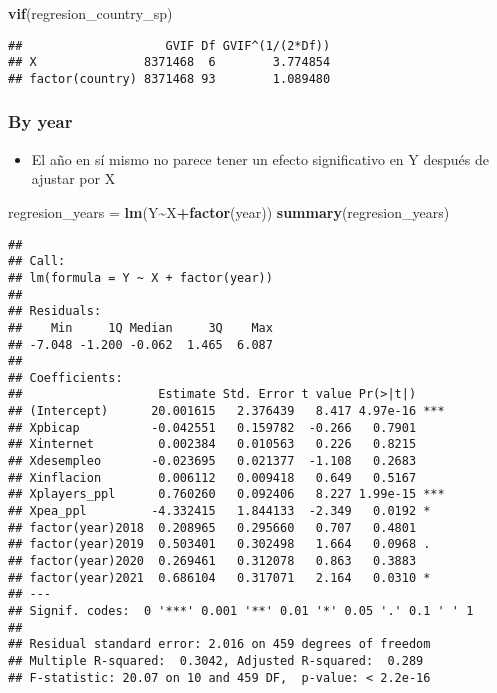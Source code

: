 \documentclass[
]{article}
\newenvironment{Shaded}{\begin{snugshade}}{\end{snugshade}}
\newcommand{\FunctionTok}[1]{\textcolor[rgb]{0.13,0.29,0.53}{\textbf{#1}}}
\newcommand{\NormalTok}[1]{#1}
\newcommand{\OtherTok}[1]{\textcolor[rgb]{0.56,0.35,0.01}{#1}}
\newcommand{\SpecialCharTok}[1]{\textcolor[rgb]{0.81,0.36,0.00}{\textbf{#1}}}
\providecommand{\tightlist}{%
  \setlength{\itemsep}{0pt}\setlength{\parskip}{0pt}}
\begin{document}
\begin{Shaded}
\begin{Highlighting}[]
\FunctionTok{vif}\NormalTok{(regresion\_country\_sp)}
\end{Highlighting}
\end{Shaded}

\begin{verbatim}
##                    GVIF Df GVIF^(1/(2*Df))
## X               8371468  6        3.774854
## factor(country) 8371468 93        1.089480
\end{verbatim}

\subsubsection{By year}\label{by-year}

\begin{itemize}
\tightlist
\item
  El año en sí mismo no parece tener un efecto significativo en Y
  después de ajustar por X
\end{itemize}

\begin{Shaded}
\begin{Highlighting}[]
\NormalTok{regresion\_years }\OtherTok{=} \FunctionTok{lm}\NormalTok{(Y}\SpecialCharTok{\textasciitilde{}}\NormalTok{X}\SpecialCharTok{+}\FunctionTok{factor}\NormalTok{(year))}
\FunctionTok{summary}\NormalTok{(regresion\_years)}
\end{Highlighting}
\end{Shaded}

\begin{verbatim}
## 
## Call:
## lm(formula = Y ~ X + factor(year))
## 
## Residuals:
##    Min     1Q Median     3Q    Max 
## -7.048 -1.200 -0.062  1.465  6.087 
## 
## Coefficients:
##                   Estimate Std. Error t value Pr(>|t|)    
## (Intercept)      20.001615   2.376439   8.417 4.97e-16 ***
## Xpbicap          -0.042551   0.159782  -0.266   0.7901    
## Xinternet         0.002384   0.010563   0.226   0.8215    
## Xdesempleo       -0.023695   0.021377  -1.108   0.2683    
## Xinflacion        0.006112   0.009418   0.649   0.5167    
## Xplayers_ppl      0.760260   0.092406   8.227 1.99e-15 ***
## Xpea_ppl         -4.332415   1.844133  -2.349   0.0192 *  
## factor(year)2018  0.208965   0.295660   0.707   0.4801    
## factor(year)2019  0.503401   0.302498   1.664   0.0968 .  
## factor(year)2020  0.269461   0.312078   0.863   0.3883    
## factor(year)2021  0.686104   0.317071   2.164   0.0310 *  
## ---
## Signif. codes:  0 '***' 0.001 '**' 0.01 '*' 0.05 '.' 0.1 ' ' 1
## 
## Residual standard error: 2.016 on 459 degrees of freedom
## Multiple R-squared:  0.3042, Adjusted R-squared:  0.289 
## F-statistic: 20.07 on 10 and 459 DF,  p-value: < 2.2e-16
\end{verbatim}
\end{document}
